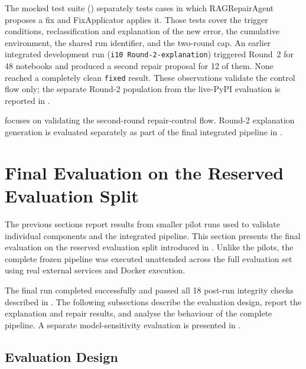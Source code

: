 The mocked test suite () separately tests cases in which
RAGRepairAgent proposes a fix and FixApplicator applies it. Those tests cover
the trigger conditions, reclassification and explanation of the new error, the
cumulative environment, the shared run identifier, and the two-round cap. An
earlier integrated development run (\texttt{i10 Round-2-explanation})
triggered Round~2 for 48 notebooks and produced a second repair proposal for
12 of them. None reached a completely clean \texttt{fixed} result. These
observations validate the control flow only; the separate Round-2 population
from the live-PyPI evaluation is reported in .

 focuses on validating the second-round
repair-control flow. Round-2 explanation generation is evaluated
separately as part of the final integrated pipeline in
.

\iffalse
\section{Final Evaluation on the Reserved Evaluation Split}
\label{sec:v-final-eval}

The previous sections report results from smaller pilot runs used to validate
individual components and the integrated pipeline. This section presents the
final evaluation on the reserved evaluation split introduced in
. Unlike the pilots, the complete frozen pipeline
was executed unattended across the full evaluation set using real external
services and Docker execution.

The final run completed successfully and passed all 18 post-run integrity
checks described in . The following subsections
describe the evaluation design, report the explanation and repair results, and
analyse the behaviour of the complete pipeline. A separate model-sensitivity
evaluation is presented in .

\subsection{Evaluation Design}
\label{sec:v-final-design}

